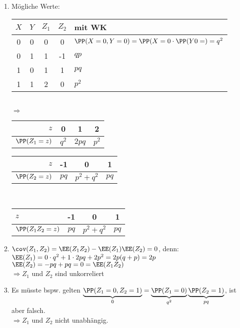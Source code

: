 \documentclass{scrreprt}
\renewenvironment{anumerate}{\begin{enumerate}[label=(\alph*)]}{\end{enumerate}} %
\begin{document}
\begin{anumerate}
\item Mögliche Werte:\\
\begin{tabular}{c c | c c | l}
$X$ & $Y$ & $Z_1$ & $Z_2$ & mit WK\\\hline
0 & 0 & 0 & 0 & $\PP(X=0,Y=0)=\PP(X=0\cdot \PP(Y0=) = q^2$\\
0 & 1 & 1 & -1 & $qp$\\
1 & 0 & 1 & 1 & $pq$\\
1 & 1 & 2 & 0 & $p^2$
\end{tabular}\\
$\Rightarrow$ \begin{tabular}{r | c c c}
$z$ & 0 & 1 & 2\\\hline
$\PP(Z_1=z)$ & $q^2$ & $2pq$ & $p^2$
\end{tabular} \quad \begin{tabular}{r | c c c}
$z$ & -1 & 0 & 1\\\hline
$\PP(Z_2=z)$ & $pq$ & $p^2+q^2$ & $pq$
\end{tabular}\\
\begin{tabular}{l | c c c }
$z$ & -1 &  0 & 1\\\hline
$\PP(Z_1Z_2=z)$ & $pq$ & $p^2+q^2$ & $pq$
\end{tabular}
\item $\cov (Z_1,Z_2)=\EE(Z_1Z_2)-\EE(Z_1) \EE(Z_2) = 0$, denn: \\
$\EE(Z_1)=0\cdot q^2 + 1 \cdot 2 pq + 2 p^2 = 2p(q+p) = 2p$\\
$\EE(Z_2)=-pq+pq = 0 =\EE(Z_1Z_2)$\\
$\Rightarrow Z_1$ und $Z_2$ sind unkorreliert
\item Es müsste bspw. gelten $\underbrace{\PP(Z_1=0, Z_2=1)}_{0}=\underbrace{\PP(Z_1=0)}_{q^2} \underbrace{\PP(Z_2=1)}_{pq}$, ist aber falsch.\\
$\Rightarrow Z_1$ und $Z_2$ nicht unabhängig.
\end{anumerate}
\end{document}

